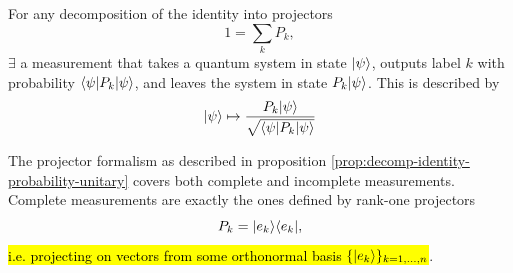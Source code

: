 \documentclass[12pt]{article}
\begin{document}
\begin{proposition}\label{prop:decomp-identity-probability-unitary}
For any decomposition of the identity into projectors $$
1 = \underset{k}{\sum} P_k,
$$ $\exists$ a measurement that takes a quantum system in state $\Ket{\psi}$, outputs label $k$ with probability $\Bra{\psi}P_k\Ket{\psi}$, and leaves the system in state $P_k\Ket{\psi}$. This is described by $$
\Ket{\psi}\mapsto \frac{P_k\Ket{\psi}}{\sqrt{\Bra{\psi}P_k\Ket{\psi}}}
$$
\end{proposition}

\begin{remark}
The projector formalism as described in proposition \ref{prop:decomp-identity-probability-unitary} covers both complete and incomplete measurements. Complete measurements are exactly the ones defined by rank-one projectors $$
P_k = \kb{e_k}{e_k},
$$ \hl{i.e. projecting on vectors from some orthonormal basis $\{\Ket{e_k}\}_{k=1, \ldots, n}$}.
\end{remark}
\end{document}
